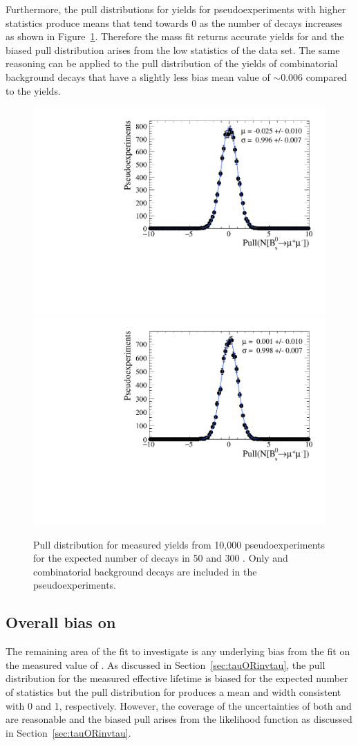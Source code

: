 Furthermore, the pull distributions for \bsmumu yields for pseudoexperiments with higher statistics produce means that tend towards 0 as the number of decays increases as shown in Figure~\ref{fig:BsmumuYieldPulls}. %
Therefore the mass fit returns accurate yields for \bsmumu and the biased pull distribution arises from the low statistics of the data set. The same reasoning can be applied to the pull distribution of the yields of combinatorial background decays that have a slightly less bias mean value of $\sim0.006$ compared to the \bsmumu yields.

\begin{figure}[tbp]
    \centering
        \includegraphics[width=0.49 \textwidth]{./Figs/LifetimeSystematics/Bs2MuMu_yield_pull_50fb.pdf}
        \includegraphics[width=0.49 \textwidth]{./Figs/LifetimeSystematics/Bs2MuMu_yield_pull_300fb.pdf}
    \caption{Pull distribution for \bsmumu measured yields from 10,000 pseudoexperiments for the expected number of decays in 50 and 300 \fb. Only \bsmumu and combinatorial background decays are included in the pseudoexperiments.}
    \label{fig:BsmumuYieldPulls}
\end{figure}


\subsection{Overall bias on \tmumu}
The remaining area of the fit to investigate is any underlying bias from the fit on the measured value of \tmumu. As discussed in Section~\ref{sec:tauORinvtau}, the pull distribution for the measured effective lifetime is biased for the expected number of statistics but the pull distribution for \Gmumu produces a mean and width consistent with 0 and 1, respectively. However, the coverage of the uncertainties of both \tmumu and \Gmumu are reasonable and the biased \tmumu pull arises from the likelihood function as discussed in Section~\ref{sec:tauORinvtau}. 

